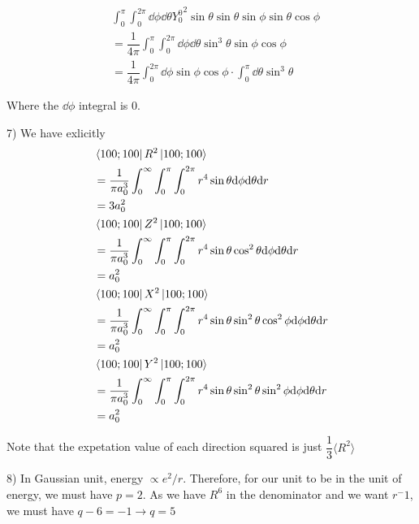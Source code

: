 \documentclass[10pt]{article}
\begin{document}
	\begin{align*}
		& \int_{0}^{\pi} \int_{0}^{2 \pi}  \dd \phi \dd \theta {Y_0^0}^2  \sin \theta  \sin \theta \sin \phi \sin \theta \cos \phi \\
		& = \dfrac{1}{4 \pi} \int_{0}^{\pi} \int_{0}^{2 \pi}  \dd \phi \dd \theta \sin^3 \theta \sin \phi \cos \phi \\
		& = \dfrac{1}{4\pi} \int_{0}^{2 \pi} \dd \phi \sin \phi \cos \phi \cdot \int_{0}^{\pi} \dd \theta \sin^3 \theta 
 	\end{align*}

	Where the $\dd \phi$ integral is 0.


7) 
	We have exlicitly 
	\begin{align*}
		&\bra*{100;100} R^2\ket*{100;100} \\
		&= \dfrac{1}{\pi a_0^3}\int_{0}^{\infty} \int_{0}^{\pi} \int_{0}^{2 \pi} r^4 \sin \theta \dd \phi \dd \theta \dd r  \\
		&= 3 a_0^2 \\
		&\bra*{100;100} Z^2\ket*{100;100} \\
		&= \dfrac{1}{\pi a_0^3}\int_{0}^{\infty} \int_{0}^{\pi} \int_{0}^{2 \pi} r^4 \sin \theta \cos^2 \theta \dd \phi \dd \theta \dd r \\
		& = a_0^2 \\
		&\bra*{100;100} X^2\ket*{100;100} \\
		&= \dfrac{1}{\pi a_0^3}\int_{0}^{\infty} \int_{0}^{\pi} \int_{0}^{2 \pi} r^4 \sin \theta \sin^2 \theta \cos^2 \phi \dd \phi \dd \theta \dd r \\
		& = a_0 ^2\\
		&\bra*{100;100} Y^2\ket*{100;100} \\
		&= \dfrac{1}{\pi a_0^3}\int_{0}^{\infty} \int_{0}^{\pi} \int_{0}^{2 \pi} r^4 \sin \theta \sin^2 \theta \sin^2 \phi \dd \phi \dd \theta \dd r \\
		& = a_0 ^2
	\end{align*}

	Note that the expetation value of each direction squared is just $\dfrac{1}{3}\langle R^2 \rangle$

8)
In Gaussian unit, energy $\propto e^2 / r$. Therefore, for our unit to be in the unit of energy, we must have $p=2$. As we have $R^6$ in the denominator and we want $r^-1$, we must have $q-6=-1 \rightarrow q=5$
\end{document}
